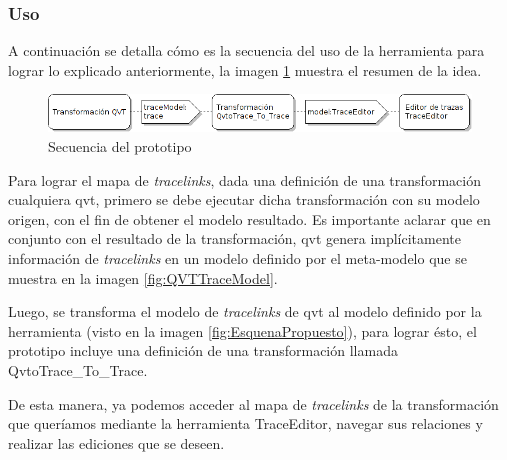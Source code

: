 \documentclass[a4paper,12pt,oneside,spanish]{book}
\begin{document}
\subsubsection{Uso}

A continuación se detalla cómo es la secuencia del uso de la herramienta para lograr lo explicado anteriormente, la imagen \ref{fig:SecuenciaPrototipo} muestra el resumen de la idea.

\bigskip

\begin{figure}[hbtp]
\centering
\includegraphics[scale=.56]{./img/Secuencia_Prototipo}
\caption{Secuencia del prototipo}
\label{fig:SecuenciaPrototipo}
\end{figure}

\bigskip

Para lograr el mapa de \textit{tracelinks}, dada una definición de una transformación cualquiera \gls{qvt}, primero se debe ejecutar dicha transformación con su modelo origen, con el fin de obtener el modelo resultado. Es importante aclarar que en conjunto con el resultado de la transformación, \gls{qvt} genera implícitamente información de \textit{tracelinks} en un modelo definido por el meta-modelo que se muestra en la imagen \ref{fig:QVTTraceModel}. 

Luego, se transforma el modelo de \textit{tracelinks} de \gls{qvt} al modelo definido por la herramienta (visto en la imagen \ref{fig:EsquenaPropuesto}), para lograr ésto, el prototipo incluye una definición de una transformación llamada \textsf{QvtoTrace\_To\_Trace}.

De esta manera, ya podemos acceder al mapa de \textit{tracelinks} de la transformación que queríamos mediante la herramienta \textsf{TraceEditor}, navegar sus relaciones y realizar las ediciones que se deseen.
\end{document}
